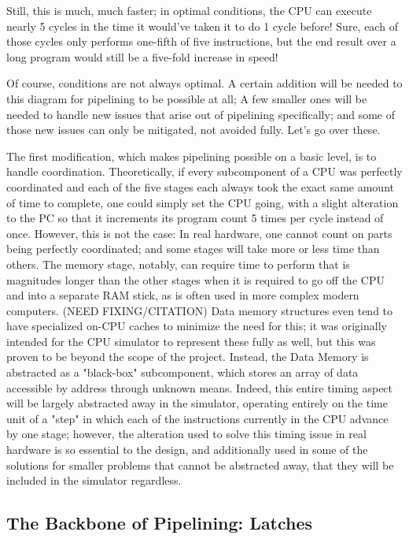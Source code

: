 \documentclass[12pt,twoside]{reedthesis}
\begin{document}
Still, this is much, much faster;  in optimal conditions, the CPU can execute nearly 5 cycles in the time it would've taken it to do 1 cycle before! Sure, each of those cycles only performs one-fifth of five instructions, but the end result over a long program would still be a five-fold increase in speed!

Of course, conditions are not always optimal. A certain addition will be needed to this diagram for pipelining to be possible at all; A few smaller ones will be needed to handle new issues that arise out of pipelining specifically; and some of those new issues can only be mitigated, not avoided fully. Let's go over these.

The first modification, which makes pipelining possible on a basic level, is to handle coordination. Theoretically, if  every subcomponent of a CPU was perfectly coordinated and each of the five stages each always took the exact same amount of time to complete, one could simply set the CPU going, with a slight alteration to the PC so that it increments its program count 5 times per cycle instead of once. However, this is not the case: In real hardware, one cannot count on parts being perfectly coordinated; and some stages will take more or less time than others. The memory stage, notably, can require time to perform that is magnitudes longer than the other stages when it is required to go off the CPU and into a separate RAM stick, as is often used in more complex modern computers. (NEED FIXING/CITATION) Data memory structures even tend to have specialized on-CPU caches to minimize the need for this; it was originally intended for the CPU simulator to represent these fully as well, but this was proven to be beyond the scope of the project. Instead, the Data Memory is abstracted as a "black-box" subcomponent, which stores an array of data accessible by address through unknown means. Indeed, this entire timing aspect will be largely abstracted away in the simulator, operating entirely on the time unit of a "step" in which each of the instructions currently in the CPU advance by one stage; however, the alteration used to solve this timing issue in real hardware is so essential to the design, and additionally used in some of the solutions for smaller problems that cannot be abstracted away, that they will be included in the simulator regardless.

\subsection{The Backbone of Pipelining: Latches}
\end{document}
